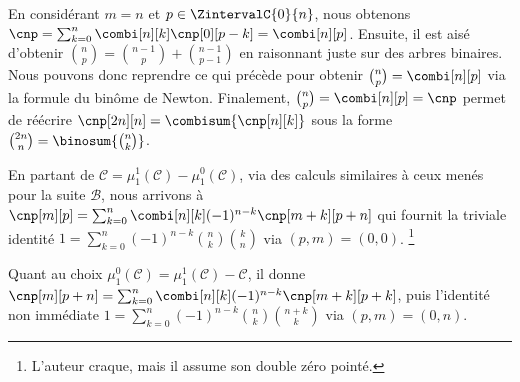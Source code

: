 En considérant $m = n$ et $p \in \ZintervalC{0}{n}$,
nous obtenons
$\cnp = \sum_{k=0}^n \combi[n][k] \cnp[0][p-k] = \combi[n][p]$.
%
Ensuite,
il est aisé d'obtenir
$\binom{n}{p} = \binom{n-1}{p} + \binom{n-1}{p-1}$
en raisonnant juste sur des arbres binaires.
%
Nous pouvons donc reprendre ce qui précède pour obtenir $\binom{n}{p} = \combi[n][p]$ via la formule du binôme de Newton.
%
Finalement,
$\binom{n}{p} = \combi[n][p] = \cnp$
permet de réécrire
$\cnp[2n][n] = \combisum{\cnp[n][k]}$
sous la forme
$\binom{2n}{n} = \binosum{\binom{n}{k}}$.




\begin{remark}
	En partant de
	$\mathcal{C} = \mu_1^1(\mathcal{C}) - \mu_1^0(\mathcal{C})$,
	via des calculs similaires à ceux menés pour la suite $\mathcal{B}$,
	nous arrivons à
    $\cnp[m][p] = \sum_{k=0}^n \combi[n][k] (-1)^{n-k} \cnp[m+k][p+n]$
    qui fournit la triviale identité
    $1 = \sum_{k=0}^n (-1)^{n-k} \binom{n}{k} \binom{k}{n}$
    via $(p,m) = (0,0)$.%
    \footnote{
    	L'auteur craque, mais il assume son double zéro pointé.
	}


    Quant au choix
	$\mu_1^0(\mathcal{C}) = \mu_1^1(\mathcal{C}) - \mathcal{C}$,
	il donne
    $\cnp[m][p+n] = \sum_{k=0}^n \combi[n][k] (-1)^{n-k} \cnp[m+k][p+k]$,
    puis l'identité non immédiate
    $1 = \sum_{k=0}^n (-1)^{n-k} \binom{n}{k} \binom{n+k}{k}$
    via $(p,m) = (0,n)$.
\end{remark}
